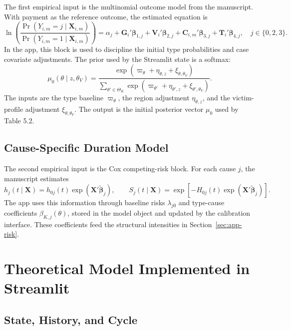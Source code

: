 \documentclass[ecta,nameyear,final,supplement]{econsocart}
\numberwithin{equation}{section}
\newcommand{\ThetaK}{\Theta_K}
\begin{document}
The first empirical input is the multinomial outcome model from the manuscript.
With payment as the reference outcome, the estimated equation is
\begin{equation}
\ln\!\left(
\frac{\Pr(Y_{i,m}=j\mid \mathbf X_{i,m})}
{\Pr(Y_{i,m}=1\mid \mathbf X_{i,m})}
\right)
=
\alpha_j+\mathbf G_i'\bm\beta_{1,j}
+\mathbf V_i'\bm\beta_{2,j}
+\mathbf C_{i,m}'\bm\beta_{3,j}
+\mathbf T_i'\bm\beta_{4,j},
\quad j\in\{0,2,3\}.
\label{eq:app-mnl}
\end{equation}
In the app, this block is used to discipline the initial type probabilities and
case covariate adjustments. The prior used by the Streamlit state is a softmax:
\begin{equation}
\mu_0(\theta\mid z,\theta_V)
=
\frac{\exp(\varpi_\theta+\eta_{\theta,z}+\xi_{\theta,\theta_V})}
{\sum_{\theta'\in\ThetaK}
\exp(\varpi_{\theta'}+\eta_{\theta',z}+\xi_{\theta',\theta_V})}.
\label{eq:app-prior}
\end{equation}
The inputs are the type baseline $\varpi_\theta$, the region adjustment
$\eta_{\theta,z}$, and the victim-profile adjustment $\xi_{\theta,\theta_V}$.
The output is the initial posterior vector $\mu_0$ used by Table 5.2.

\subsection{Cause-Specific Duration Model}

The second empirical input is the Cox competing-risk block. For each cause
$j$, the manuscript estimates
\begin{equation}
h_j(t\mid\mathbf X)
=
h_{0j}(t)\exp(\mathbf X'\widetilde{\bm\beta}_j),
\qquad
S_j(t\mid\mathbf X)
=
\exp\!\left[-H_{0j}(t)\exp(\mathbf X'\widetilde{\bm\beta}_j)\right].
\label{eq:app-cox}
\end{equation}
The app uses this information through baseline risks $\lambda_{j0}$ and
type-cause coefficients $\beta_{K,j}(\theta)$, stored in the model object and
updated by the calibration interface. These coefficients feed the structural
intensities in Section~\ref{sec:app-risk}.

\section{Theoretical Model Implemented in Streamlit}

\subsection{State, History, and Cycle}
\end{document}
